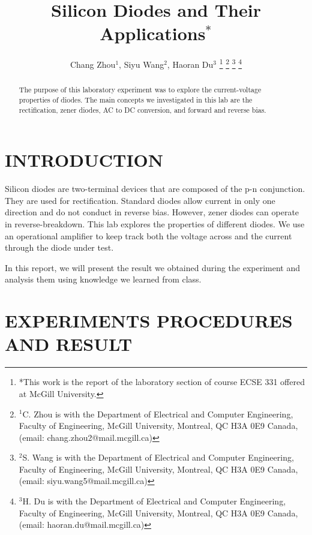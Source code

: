 \documentclass[letterpaper, 10 pt, conference]{ieeeconf}  %
\title{\Huge Silicon Diodes and Their Applications$^{*}$}
\author{Chang Zhou$^{1}$, Siyu Wang$^{2}$, Haoran Du$^{3}$%
\thanks{*This work is the report of the laboratory section of course ECSE 331 offered at McGill University.}%
\thanks{$^{1}$C. Zhou is with the Department of Electrical and Computer
Engineering, Faculty of Engineering, McGill University, Montreal, QC H3A 0E9 Canada,
(email: chang.zhou2@mail.mcgill.ca)}%
\thanks{$^{2}$S. Wang is with the Department of Electrical and Computer
Engineering, Faculty of Engineering, McGill University, Montreal, QC H3A 0E9 Canada,
(email: siyu.wang5@mail.mcgill.ca)}%
\thanks{$^{3}$H. Du is with the Department of Electrical and Computer
Engineering, Faculty of Engineering, McGill University, Montreal, QC H3A 0E9 Canada,
(email: haoran.du@mail.mcgill.ca)}%
}
\begin{document}

\maketitle
\thispagestyle{fancy}
\pagestyle{fancy}
\setcounter{page}{1}
\fancyhf{} %
\renewcommand{\headrulewidth}{0pt} %
\rhead{\thepage}

\begin{abstract}
  The purpose of this laboratory experiment was to explore the current-voltage properties of diodes. The main concepts we investigated in this lab are the rectification, zener diodes, AC to DC conversion, and forward and reverse bias.
\end{abstract}

\section{INTRODUCTION}
Silicon diodes are two-terminal devices that are composed of the p-n conjunction. They are used for rectification. Standard diodes allow current in only one direction and do not conduct in reverse bias. However, zener diodes can operate in reverse-breakdown. This lab explores the properties of different diodes. We use an operational amplifier to keep track both the voltage across and the current through the diode under test.
\par In this report, we will present the result we obtained during the experiment and analysis them using knowledge we learned from class.
\section{EXPERIMENTS PROCEDURES AND RESULT}
\end{document}
